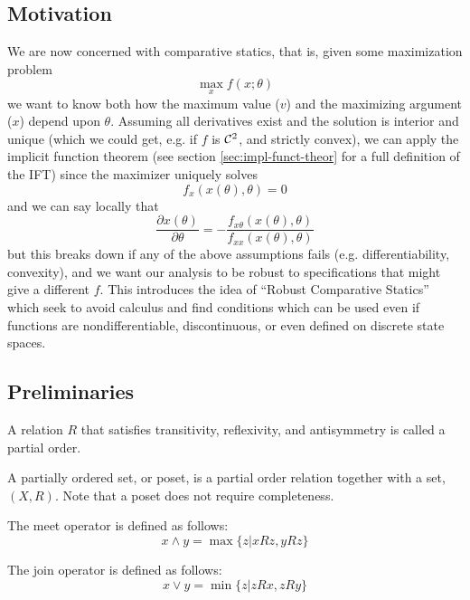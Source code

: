 

\subsection{Motivation}
\label{sec:motivation}

We are now concerned with comparative statics, that is, given some
maximization problem
\[
\max_{x} f(x; \theta)
\]
we want to know both how the maximum value ($v$) and the maximizing
argument ($x$) depend upon $\theta$. Assuming all derivatives exist
and the solution is interior and unique (which we could get, e.g. if
$f$ is ${\cal C}^2$, and strictly convex), we can apply the implicit
function theorem (see section \ref{sec:impl-funct-theor} for a full
definition of the IFT) since the maximizer uniquely solves
\[
f_x(x(\theta), \theta) = 0
\]
and we can say locally that
\[
\frac{\partial x(\theta)}{\partial \theta}
= - \frac{f_{x\theta}(x(\theta), \theta)}{f_{xx}(x(\theta),\theta)}
\]
but this breaks down if any of the above assumptions fails
(e.g. differentiability, convexity), and we want our analysis to be
robust to specifications that might give a different $f$. This
introduces the idea of ``Robust Comparative Statics'' which seek to
avoid calculus and find conditions which can be used even if functions
are nondifferentiable, discontinuous, or even defined on discrete
state spaces.


\subsection{Preliminaries}
\label{sec:preliminaries}

\begin{definition}
  A relation $R$ that satisfies transitivity, reflexivity, and
  antisymmetry is called a partial order.
\end{definition}

\begin{definition}
  A partially ordered set, or poset, is a partial order relation
  together with a set, $(X, R)$. Note that a poset does not require
  completeness.
\end{definition}

\begin{definition}[Meet]
  The meet operator is defined as follows:
  \[
  x \wedge y = \max\{z | xRz, yRz\}
  \]
\end{definition}

\begin{definition}[Join]
  The join operator is defined as follows:
  \[
  x \vee y = \min\{z | zRx, zRy\}
  \]
\end{definition}

